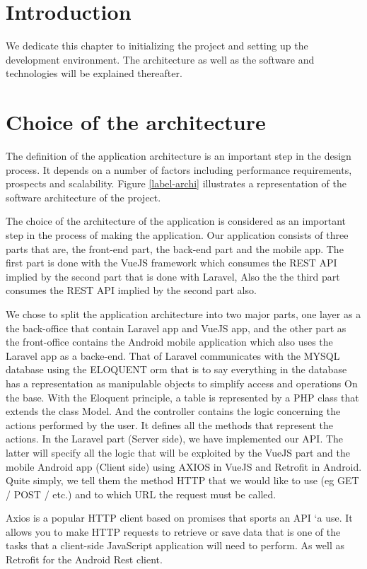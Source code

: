 \documentclass[12pt,a4paper]{report}
\begin{document}
	\section*{Introduction}
	We dedicate this chapter to initializing the project and setting up the development environment. The architecture as well as the software and technologies will be explained
	thereafter.
	\section{Choice of the architecture}
	The definition of the application architecture is an important step in the design process. It depends on a number of factors including performance requirements, prospects and scalability. Figure \ref{label-archi} illustrates a representation of the software architecture of the project.\par 
	The choice of the architecture of the application is considered as an important step
	in the process of making the application. Our application
	consists of three parts that are, the front-end part, the back-end part and the mobile app. The first part
	is done with the VueJS framework which consumes the REST API implied by the second
	part that is done with Laravel, Also the the third part consumes the REST API implied by the second part also.\par
	
	We chose to split the application architecture into two major parts,
	one layer as a the back-office that contain Laravel app and VueJS app, and the other part as the front-office contains the Android mobile application which also uses the Laravel app as a backe-end. 
	That of Laravel communicates
	with the MYSQL database using the ELOQUENT
	\ac{orm} that is to say everything in the database has a
	representation as manipulable objects to simplify access and operations
	On the base.
	With the Eloquent principle, a table is represented by a PHP class that extends the class
	Model. And the controller contains the logic concerning the actions performed by the user. It
	defines all the methods that represent the actions.
	In the Laravel part (Server side), we have implemented our API. The latter will specify all the logic that will be exploited by
	the VueJS part and the mobile Android app (Client side) using AXIOS in VueJS and Retrofit in Android. Quite simply, we tell them the method
	HTTP that we would like to use (eg GET / POST / etc.) and to which URL the request
	must be called.\par
	Axios is a popular HTTP client based on promises that sports an API `a
	use. It allows you to make HTTP requests to retrieve or save data that
	is one of the tasks that a client-side JavaScript application will need to perform.
	As well as Retrofit for the Android Rest client.\par
	
\end{document}
